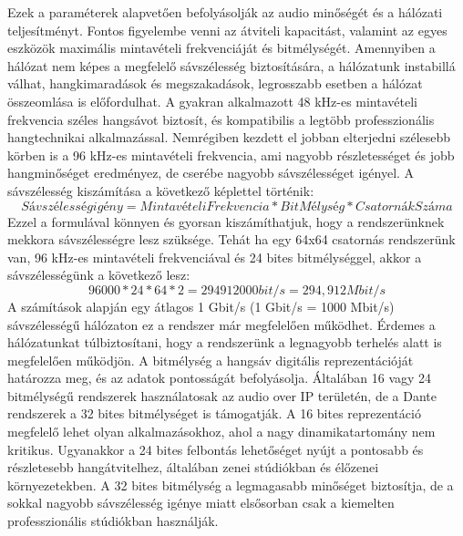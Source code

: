 Ezek a paraméterek alapvetően befolyásolják az audio minőségét és a hálózati teljesítményt.
Fontos figyelembe venni az átviteli kapacitást, valamint az egyes eszközök maximális mintavételi frekvenciáját és bitmélységét.
Amennyiben a hálózat nem képes a megfelelő sávszélesség biztosítására, a hálózatunk instabillá válhat, 
hangkimaradások és megszakadások, legrosszabb esetben a hálózat összeomlása is előfordulhat.
A gyakran alkalmazott 48 kHz-es mintavételi frekvencia széles hangsávot biztosít, és kompatibilis a legtöbb
professzionális hangtechnikai alkalmazással. 
Nemrégiben kezdett el jobban elterjedni szélesebb körben is a 96 kHz-es mintavételi frekvencia, ami
nagyobb részletességet és jobb hangminőséget eredményez, de cserébe nagyobb sávszélességet igényel.
A sávszélesség kiszámítása a következő képlettel történik:
\begin{equation}
	\label{eq:sávszélesség}
	Sávszélesség igény = MintavételiFrekvencia * BitMélység * CsatornákSzáma
\end{equation}
Ezzel a formulával könnyen és gyorsan kiszámíthatjuk, hogy a rendszerünknek mekkora sávszélességre lesz szüksége.
Tehát ha egy 64x64 csatornás rendszerünk van, 96 kHz-es mintavételi frekvenciával és 24 bites bitmélységgel,
akkor a sávszélességünk a következő lesz:
\begin{equation}
	\label{eq:sávszélesség}
	96000 * 24 * 64 * 2 = 294912000 bit/s = 294,912 Mbit/s 
\end{equation}
A számítások alapján egy átlagos 1 Gbit/s (1 Gbit/s = 1000 Mbit/s) sávszélességű hálózaton ez a rendszer már megfelelően működhet.
Érdemes a hálózatunkat túlbiztosítani, hogy a rendszerünk a legnagyobb terhelés alatt is megfelelően működjön.
A bitmélység a hangsáv digitális reprezentációját határozza meg, és az adatok pontosságát befolyásolja.
Általában 16 vagy 24 bitmélységű rendszerek használatosak az audio over IP területén, de a Dante rendszerek a 
32 bites bitmélységet is támogatják. A 16 bites reprezentáció megfelelő lehet olyan alkalmazásokhoz, ahol a nagy
dinamikatartomány nem kritikus. Ugyanakkor a 24 bites felbontás lehetőséget nyújt a pontosabb és részletesebb hangátvitelhez,
általában zenei stúdiókban és élőzenei környezetekben. 
A 32 bites bitmélység a legmagasabb minőséget biztosítja, de a sokkal nagyobb sávszélesség igénye miatt elsősorban csak
a kiemelten professzionális stúdiókban használják.
